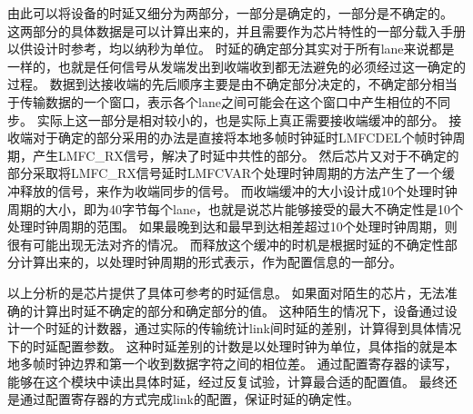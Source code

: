\documentclass[UTF8]{ctexart}
\begin{document}
由此可以将设备的时延又细分为两部分，一部分是确定的，一部分是不确定的。
这两部分的具体数据是可以计算出来的，并且需要作为芯片特性的一部分载入手册以供设计时参考，均以纳秒为单位。
时延的确定部分其实对于所有lane来说都是一样的，也就是任何信号从发端发出到收端收到都无法避免的必须经过这一确定的过程。
数据到达接收端的先后顺序主要是由不确定部分决定的，不确定部分相当于传输数据的一个窗口，表示各个lane之间可能会在这个窗口中产生相位的不同步。
实际上这一部分是相对较小的，也是实际上真正需要接收端缓冲的部分。
接收端对于确定的部分采用的办法是直接将本地多帧时钟延时LMFCDEL个帧时钟周期，产生LMFC\_RX信号，解决了时延中共性的部分。
然后芯片又对于不确定的部分采取将LMFC\_RX信号延时LMFCVAR个处理时钟周期的方法产生了一个缓冲释放的信号，来作为收端同步的信号。
而收端缓冲的大小设计成10个处理时钟周期的大小，即为40字节每个lane，也就是说芯片能够接受的最大不确定性是10个处理时钟周期的范围。
如果最晚到达和最早到达相差超过10个处理时钟周期，则很有可能出现无法对齐的情况。
而释放这个缓冲的时机是根据时延的不确定性部分计算出来的，以处理时钟周期的形式表示，作为配置信息的一部分。

以上分析的是芯片提供了具体可参考的时延信息。
如果面对陌生的芯片，无法准确的计算出时延不确定的部分和确定部分的值。
这种陌生的情况下，设备通过设计一个时延的计数器，通过实际的传输统计link间时延的差别，计算得到具体情况下的时延配置参数。
这种时延差别的计数是以处理时钟为单位，具体指的就是本地多帧时钟边界和第一个收到数据字符之间的相位差。
通过配置寄存器的读写，能够在这个模块中读出具体时延，经过反复试验，计算最合适的配置值。
最终还是通过配置寄存器的方式完成link的配置，保证时延的确定性。


\end{document}
